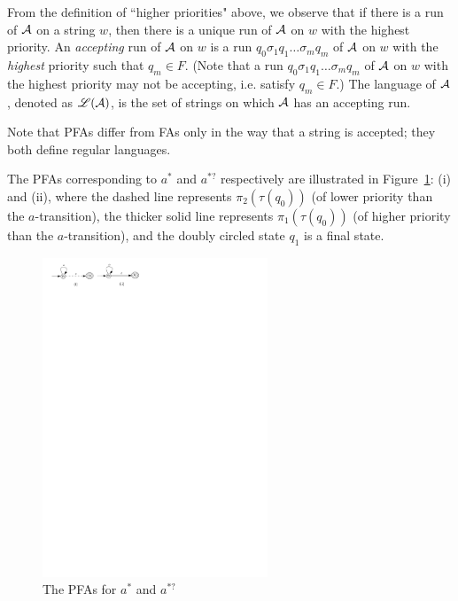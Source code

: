 From the definition of ``higher priorities" above, we observe that if there is a  run of $\mathcal{A}$ on a string $w$, then there is a unique run of $\mathcal{A}$ on $w$ with the highest priority. 
An \emph{accepting} run of $\mathcal{A}$ on $w$ is a run $q_0 \sigma_1 q_1 \ldots \sigma_m q_m$ of $\mathcal{A}$ on $w$ with the \emph{highest} priority such that $q_m \in F$. (Note that a run $q_0 \sigma_1 q_1 \ldots \sigma_m q_m$ of $\mathcal{A}$ on $w$ with the highest priority may not be accepting, i.e. satisfy $q_m \in F$.) The language of $\mathcal{A}$, denoted as $\mathscr{L}(\mathcal{A})$, is the set of strings on which $\mathcal{A}$ has an accepting run.


Note that PFAs differ from FAs only in the way that a string is accepted; they both define regular languages. 


\begin{example}\label{exmp-pfa}
The PFAs corresponding to $a^\ast$ and $a^{\ast?}$ respectively are illustrated in Figure~\ref{fig-pfa}: (i) and (ii), where the dashed line represents $\pi_2(\tau(q_0))$ (of lower priority than the $a$-transition), the thicker solid line represents $\pi_1(\tau(q_0))$ (of higher priority than the $a$-transition), and the doubly circled state $q_1$ is a final state.

\begin{figure}[ht]
\centering
\includegraphics[width=0.6\textwidth]{pfa.pdf}
\caption{The PFAs for $a^\ast$ and $a^{\ast?}$}
\label{fig-pfa}
\end{figure}

\end{example}


